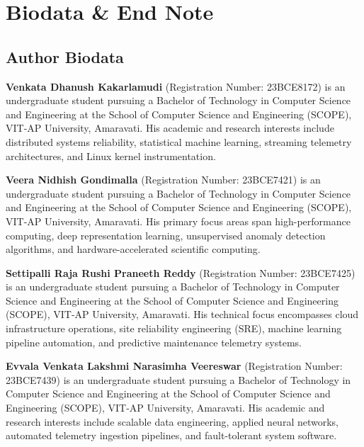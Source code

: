 \chapter*{Biodata \& End Note}

\section*{Author Biodata}

\textbf{Venkata Dhanush Kakarlamudi} (Registration Number: 23BCE8172) is an undergraduate student pursuing a Bachelor of Technology in Computer Science and Engineering at the School of Computer Science and Engineering (SCOPE), VIT-AP University, Amaravati. His academic and research interests include distributed systems reliability, statistical machine learning, streaming telemetry architectures, and Linux kernel instrumentation.

\vspace{0.4cm}

\noindent\textbf{Veera Nidhish Gondimalla} (Registration Number: 23BCE7421) is an undergraduate student pursuing a Bachelor of Technology in Computer Science and Engineering at the School of Computer Science and Engineering (SCOPE), VIT-AP University, Amaravati. His primary focus areas span high-performance computing, deep representation learning, unsupervised anomaly detection algorithms, and hardware-accelerated scientific computing.

\vspace{0.4cm}

\noindent\textbf{Settipalli Raja Rushi Praneeth Reddy} (Registration Number: 23BCE7425) is an undergraduate student pursuing a Bachelor of Technology in Computer Science and Engineering at the School of Computer Science and Engineering (SCOPE), VIT-AP University, Amaravati. His technical focus encompasses cloud infrastructure operations, site reliability engineering (SRE), machine learning pipeline automation, and predictive maintenance telemetry systems.

\vspace{0.4cm}

\noindent\textbf{Evvala Venkata Lakshmi Narasimha Veereswar} (Registration Number: 23BCE7439) is an undergraduate student pursuing a Bachelor of Technology in Computer Science and Engineering at the School of Computer Science and Engineering (SCOPE), VIT-AP University, Amaravati. His academic and research interests include scalable data engineering, applied neural networks, automated telemetry ingestion pipelines, and fault-tolerant system software.


